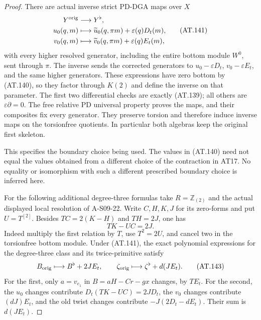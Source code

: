 \begin{proof}
There are actual inverse strict PD-DGA maps over $X$
\[
 \begin{aligned}
 Y^{\rm orig}&\longrightarrow Y^\flat,\\
 u_0(q,m)&\longmapsto
       \widetilde u_0(q,\pi m)+\varepsilon(q)D_t(m),\\
 v_0(q,m)&\longmapsto
       \widetilde v_0(q,\pi m)+\varepsilon(q)E_t(m),
 \end{aligned}                                                     \tag{AT.141}
\]
with every higher resolved generator, including the entire
bottom module $W^0$, sent through $\pi$.
The inverse sends the corrected generators to
$u_0-\varepsilon D_t$, $v_0-\varepsilon E_t$, and the same
higher generators. These expressions have zero bottom
by (AT.140), so they factor through $K(2)$ and define the
inverse on that parameter.
The first two differential checks are exactly (AT.139);
all others are $\varepsilon\partial=0$.
The free relative PD universal property proves the maps,
and their composites fix every generator.
They preserve torsion and therefore induce inverse maps
on the torsionfree quotients.
In particular both algebras keep the original first skeleton.

This specifies the boundary choice being used.
The values in (AT.140) need not equal the values obtained
from a different choice of the contraction in AT17.
No equality or isomorphism with such a different prescribed
boundary choice is inferred here.

For the following additional degree-three formulas take
$R=\mathbb Z_{(2)}$ and the actual displayed local
resolution of A-S09-22.
Write $C,H,K,J$ for its zero-forms and put $U=T^{[2]}$.
Besides $TC=2(K-H)$ and $TH=2J$, one has
\[
                            TK-UC=2J.
 \tag{AT.142}
\]
Indeed multiply the first relation by $T$, use $T^2=2U$,
and cancel two in the torsionfree bottom module.
Under (AT.141), the exact polynomial expressions for the
degree-three class and its twice-primitive satisfy
\[
 B_{\rm orig}\longmapsto B^\flat+2JE_t,\qquad
 \zeta_{\rm orig}\longmapsto\zeta^\flat+d(JE_t).
 \tag{AT.143}
\]
For the first, only $a=v_{e_1}$ in $B=aH-Cr-gx$ changes,
by $TE_t$. For the second, the $u_0$ changes contribute
$D_t(TK-UC)=2JD_t$, the $v_0$ changes contribute
$(dJ)E_t$, and the old twist changes contribute
$-J(2D_t-dE_t)$. Their sum is $d(JE_t)$.


\end{proof}

